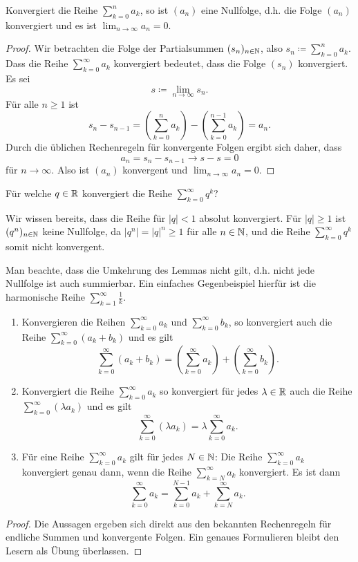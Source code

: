 \documentclass[a4paper,10pt]{article}
\begin{document}
\begin{lem}\label{lem: Reihe bedeutet Nullfolge}
 Konvergiert die Reihe $\sum_{k=0}^n a_k$, so ist $(a_n)$ eine Nullfolge, d.h. die Folge $(a_n)$ konvergiert und es ist $\lim_{n \to \infty} a_n = 0$.
\end{lem}
\begin{proof}
 Wir betrachten die Folge der Partialsummen $(s_n)_{n \in \mathbb{N}}$, also $s_n \coloneqq \sum_{k=0}^n a_k$. Dass die Reihe $\sum_{k=0}^\infty a_k$ konvergiert bedeutet, dass die Folge $(s_n)$ konvergiert. Es sei
 \[
  s \coloneqq \lim_{n \to \infty} s_n.
 \]
 Für alle $n \geq 1$ ist
 \[
  s_n - s_{n-1}
  = \left( \sum_{k=0}^n a_k \right) - \left( \sum_{k=0}^{n-1} a_k \right)
  = a_n.
 \]
 Durch die üblichen Rechenregeln für konvergente Folgen ergibt sich daher, dass
 \[
  a_n = s_n - s_{n-1} \to s-s = 0
 \]
 für $n \to \infty$. Also ist $(a_n)$ konvergent und $\lim_{n \to \infty} a_n = 0$.
\end{proof}


\begin{question}
 Für welche $q \in \mathbb{R}$ konvergiert die Reihe $\sum_{k=0}^\infty q^k$?
\end{question}
\begin{solution}
 Wir wissen bereits, dass die Reihe für $|q| < 1$ absolut konvergiert. Für $|q| \geq 1$ ist $(q^n)_{n \in \mathbb{N}}$ keine Nullfolge, da $|q^n| = |q|^n \geq 1$ für alle $n \in \mathbb{N}$, und die Reihe $\sum_{k=0}^\infty q^k$ somit nicht konvergent.
\end{solution}


Man beachte, dass die Umkehrung des Lemmas nicht gilt, d.h. nicht jede Nullfolge ist auch summierbar. Ein einfaches Gegenbeispiel hierfür ist die harmonische Reihe $\sum_{k=1}^\infty \frac{1}{k}$.


\begin{prop}
 \begin{enumerate}
  \item
   Konvergieren die Reihen $\sum_{k=0}^\infty a_k$ und $\sum_{k=0}^\infty b_k$, so konvergiert auch die Reihe $\sum_{k=0}^\infty (a_k + b_k)$ und es gilt
   \[
    \sum_{k=0}^\infty (a_k + b_k) = \left( \sum_{k=0}^\infty a_k \right) + \left( \sum_{k=0}^\infty b_k \right).
   \]
  \item
   Konvergiert die Reihe $\sum_{k=0}^\infty a_k$ so konvergiert für jedes $\lambda \in \mathbb{R}$ auch die Reihe $\sum_{k=0}^\infty (\lambda a_k)$ und es gilt
   \[
    \sum_{k=0}^\infty (\lambda a_k) = \lambda \sum_{k=0}^\infty a_k.
   \]
  \item
   Für eine Reihe $\sum_{k=0}^\infty a_k$ gilt für jedes $N \in \mathbb{N}$: Die Reihe $\sum_{k=0}^\infty a_k$ konvergiert genau dann, wenn die Reihe $\sum_{k=N}^\infty a_k$ konvergiert. Es ist dann
   \[
    \sum_{k=0}^\infty a_k = \sum_{k=0}^{N-1} a_k + \sum_{k=N}^\infty a_k.
   \]
 \end{enumerate}
\end{prop}
\begin{proof}
 Die Aussagen ergeben sich direkt aus den bekannten Rechenregeln für endliche Summen und konvergente Folgen. Ein genaues Formulieren bleibt den Lesern als Übung überlassen.
\end{proof}
\end{document}
